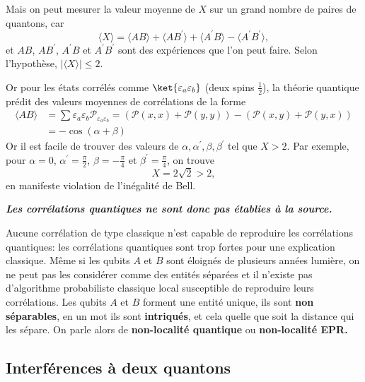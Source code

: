 Mais on peut mesurer la valeur moyenne de $X$ sur un grand nombre de paires de
quantons, car%
\begin{equation}
\langle X\rangle=\langle AB\rangle+\langle AB^{\prime}\rangle+\langle
A^{\prime}B\rangle -\langle A^{\prime}B^{\prime}\rangle,
\end{equation}
et $AB$, $AB^{\prime}$, $A^{\prime}B$ et $A^{\prime}B^{\prime}$ sont des
expériences que l'on peut faire. Selon l'hypothèse, $|\langle X\rangle|\leq2$.

Or pour les états corrélés comme $\ket{\varepsilon_{a}\varepsilon_{b}}$
(deux spins $\frac{1}{2}$), la théorie quantique prédit des valeurs moyennes de
corrélations de la forme%
\begin{equation}
\begin{split}
\langle AB\rangle & =\sum\varepsilon_{a}\varepsilon_{b}
\mathcal{P}_{\varepsilon_{a}\varepsilon_{b}}=(\mathcal{P}(x,x)+\mathcal{P}%
(y,y))-(\mathcal{P}(x,y)+\mathcal{P}(y,x))\\
& =-\cos(\alpha+\beta)
\end{split}
\end{equation}
Or il est facile de trouver des valeurs de $\alpha,\alpha^{\prime},\beta
,\beta^{\prime}$ tel que $X>2$. Par exemple, pour $\alpha=0$, $\alpha^{\prime
}=\frac{\pi}{2}$, $\beta=-\frac{\pi}{4}$ et $\beta^{\prime}=\frac{\pi}{4}$, on
trouve%
\begin{equation}
X=2\sqrt{2}>2,
\end{equation}
en manifeste violation de l'inégalité de Bell.
\begin{center}
\textbf{\emph{Les corrélations quantiques ne sont donc pas établies à la
source.} }
\end{center}

Aucune corrélation de type classique n'est capable de reproduire les
corrélations quantiques: les corrélations quantiques sont trop fortes pour une
explication classique. Même si les qubits $A$ et $B$ sont éloignés de plusieurs
années lumière, on ne peut pas les considérer comme des entités séparées et il
n'existe pas d'algorithme probabiliste classique local susceptible de reproduire
leurs corrélations. Les qubits $A$ et $B$ forment une entité unique, ils sont
\textbf{non séparables}, en un mot ils sont \textbf{intriqués}, et cela quelle
que soit la distance qui les sépare. On parle alors de \textbf{non-localité
quantique} ou \textbf{non-localité EPR.}

\subsection{Interférences à deux quantons}

